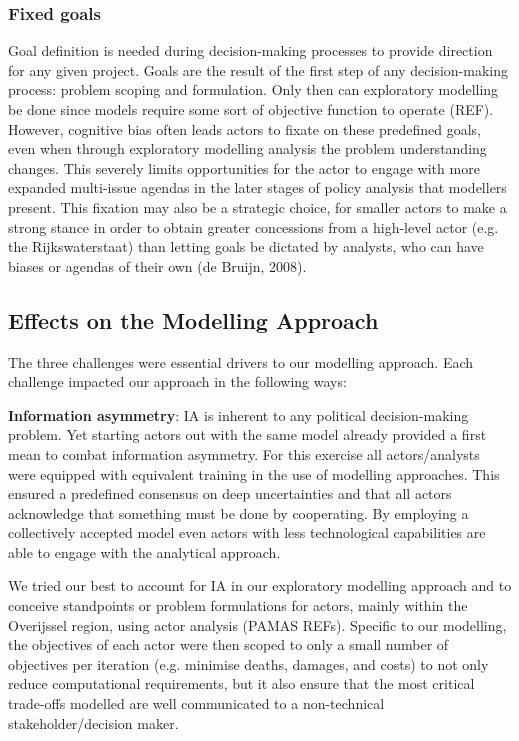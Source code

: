 \subsubsection{Fixed goals}
Goal definition is needed during decision-making processes to provide direction for any given project. Goals are the result of the first step of any decision-making process: problem scoping and formulation. Only then can exploratory modelling be done since models require some sort of objective function to operate (REF). However, cognitive bias often leads actors to fixate on these predefined goals, even when through exploratory modelling analysis the problem understanding changes. This severely limits opportunities for the actor to engage with more expanded multi-issue agendas in the later stages of policy analysis that modellers present. This fixation may also be a strategic choice, for smaller actors to make a strong stance in order to obtain greater concessions from a high-level actor (e.g. the Rijkswaterstaat) than letting goals be dictated by analysts, who can have biases or agendas of their own (de Bruijn, 2008). 
\subsection{Effects on the Modelling Approach}

The three challenges were essential drivers to our modelling approach. Each challenge impacted our approach in the following ways: 

\textbf{Information asymmetry}: IA is inherent to any political decision-making problem. Yet starting actors out with the same model already provided a first mean to combat information asymmetry. For this exercise all actors/analysts were equipped with equivalent training in the use of modelling approaches. This ensured a predefined consensus on deep uncertainties and that all actors acknowledge that something must be done by cooperating. By employing a collectively accepted model even actors with less technological capabilities are able to engage with the analytical approach.

We tried our best to account for IA in our exploratory modelling approach and to conceive standpoints or problem formulations for actors, mainly within the Overijssel region, using actor analysis (PAMAS REFs). Specific to our modelling, the objectives of each actor were then scoped to only a small number of objectives per iteration (e.g. minimise deaths, damages, and costs) to not only reduce computational requirements, but it also ensure that the most critical trade-offs modelled are well communicated to a non-technical stakeholder/decision maker. 

